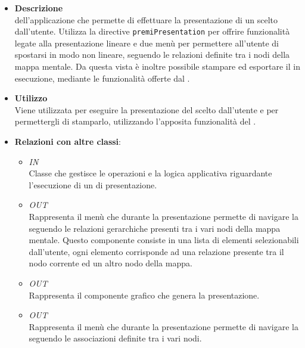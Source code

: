 \begin{itemize}
\item \textbf{Descrizione}\\
 dell’applicazione che permette di effettuare la presentazione di un  scelto dall’utente. Utilizza la directive \texttt{premiPresentation} per offrire funzionalità legate alla presentazione lineare e due menù per permettere all'utente di spostarsi in modo non lineare, seguendo le relazioni definite tra i nodi della mappa mentale.
Da questa vista è inoltre possibile stampare ed esportare il  in esecuzione, mediante le funzionalità offerte dal .
\item \textbf{Utilizzo}\\
Viene utilizzata per eseguire la presentazione del  scelto dall’utente e per permettergli di stamparlo, utilizzando l’apposita funzionalità del .
\item \textbf{Relazioni con altre classi}:
\begin{itemize}
\item \textit{IN} \hyperref[\nogloxy{Premi::Front-End::Controllers::PresentationViewerController}]{}\\
Classe che gestisce le operazioni e la logica applicativa riguardante l’esecuzione di un  di presentazione.
\item \textit{OUT} \hyperref[\nogloxy{Premi::Front-End::Directives::premiHierarchicalMenu}]{}\\
Rappresenta il menù che durante la presentazione permette di navigare la  seguendo le relazioni gerarchiche presenti tra i vari nodi della mappa mentale. Questo componente consiste in una lista di elementi selezionabili dall’utente, ogni elemento corrisponde ad una relazione presente tra il nodo corrente ed un altro nodo della mappa.
\item \textit{OUT} \hyperref[\nogloxy{Premi::Front-End::Directives::premiPresentation}]{}\\
Rappresenta il componente grafico che genera la presentazione.
\item \textit{OUT} \hyperref[\nogloxy{Premi::Front-End::Directives::premiSmartMenu}]{}\\
Rappresenta il menù che durante la presentazione permette di navigare la  seguendo le associazioni definite tra i vari nodi.

\end{itemize}
\end{itemize}
